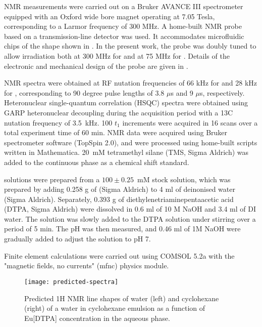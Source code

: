 NMR measurements were carried out on a Bruker AVANCE III
spectrometer equipped with an Oxford wide bore magnet operating at 7.05 Tesla,
corresponding to a  Larmor frequency of 300 MHz. A home-built NMR probe
based on a transmission-line detector was used.\cite{Finch:2016gv}
It accommodates microfluidic chips of the shape shown in .
In the present work, the probe was doubly
tuned to allow irradiation both at 300 MHz for  and at 75 MHz for
. Details of the electronic and mechanical design of the
probe are given in \cite{Finch:2017vb}.

NMR spectra were obtained at RF nutation frequencies of 66 kHz for
 and 28 kHz for , corresponding to 90 degree pulse lengths of
3.8 $\mu$s and 9 $\mu$s, respectively. Heteronuclear
single-quantum correlation (HSQC) spectra were obtained using
GARP heteronuclear decoupling during the acquisition period with a
13C nutation frequency of 3.5~kHz.
100 $t_1$ increments were acquired in 16 scans over a total experiment time of
60 min. NMR data were acquired using Bruker spectrometer software (TopSpin 2.0),
and were processed using home-built scripts written in Mathematica.
20~mM tetramethyl silane (TMS, Sigma Aldrich) was added to the continuous phase
as a chemical shift standard.

 solutions were prepared  from a $100\pm0.25$~mM
stock solution, which was prepared by adding 0.258 g of 
(Sigma Aldrich) to 4 ml of deinonised water (Sigma Aldrich). Separately,
0.393 g of diethylenetriaminepentaacetic acid (DTPA, Sigma Aldrich)
were dissolved in 0.6 ml of 10 M NaOH and 3.4 ml of DI water.
The  solution was slowly added to the DTPA solution under
stirring over a period of 5 min. The pH was then measured,
and 0.46 ml of 1M NaOH were gradually added to adjust the solution to pH 7.

Finite element calculations were carried out using COMSOL 5.2a with the "magnetic
fields, no currents" (mfnc) physics module.


\begin{figure}
  \begin{center}
    \texttt{[image: predicted-spectra]}
  \end{center}
  \caption{Predicted 1H NMR line shapes of water (left) and cyclohexane (right) of a
  water in cyclohexane emulsion as a function of {Eu[DTPA]} concentration
  in the aqueous phase.
  }
  \label{fig:predicted-spectra}
\end{figure}


